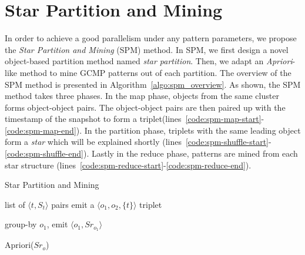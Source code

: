 \section{Star Partition and Mining}
\label{sec:spm_solution}
In order to achieve a good parallelism 
under any pattern parameters, we propose 
the \emph{Star Partition and Mining} (SPM) method. In SPM,
we first design a novel object-based partition method named \emph{star partition}. 
Then, we adapt an \emph{Apriori}-like 
method to mine GCMP patterns out of each partition.
The overview of the SPM method is presented in Algorithm~\ref{algo:spm_overview}.
As shown, the SPM method takes three phases. 
In the map phase, objects from the same cluster forms object-object pairs. 
The object-object pairs are then paired up with the timestamp of 
the snapshot to form a triplet(lines~\ref{code:spm-map-start}-\ref{code:spm-map-end}). 
In the partition phase, triplets with the same leading object form a \emph{star} which will be explained shortly 
(lines~\ref{code:spm-shuffle-start}-\ref{code:spm-shuffle-end}).
Lastly in the reduce phase, patterns are mined from each star structure (lines~\ref{code:spm-reduce-start}-\ref{code:spm-reduce-end}).

\begin{algorithm}
\caption{Star Partition and Mining}
\label{algo:spm_overview}
\begin{algorithmic}[1]
\Require list of $\langle t, S_t \rangle$ pairs
\label{code:spm-map-start}
		  \label{code:spm-edge-direct}
			\State emit a $\langle o_1, o_2, \{t\}\rangle$ triplet
		\EndIf
	\EndFor
\EndFor
\label{code:spm-map-end}

\label{code:spm-shuffle-start}
	\State group-by $o_1$, emit $\langle o_1, Sr_{o_1} \rangle$ 
\EndFor
\label{code:spm-shuffle-end}

\label{code:spm-reduce-start}
\State Apriori($Sr_o$)
\EndFor
\label{code:spm-reduce-end}

\end{algorithmic}
\end{algorithm}

